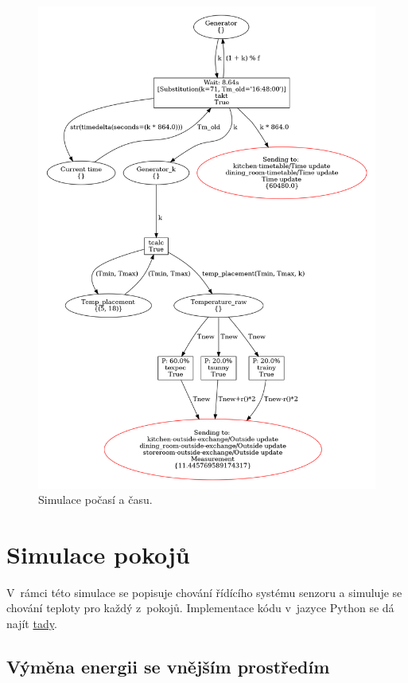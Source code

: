 \begin{figure}[htb]
 \centering
 \includegraphics[width=\textwidth]{obrazky-figures/weather-sim.png}
 \caption{Simulace počasí a času.}
 \label{weather-viz}
\end{figure}

\section{Simulace pokojů}
\label{sec:room-sim-details}

V~rámci této simulace se popisuje chování řídícího systému senzoru a simuluje se chování teploty pro každý z~pokojů. Implementace kódu v~jazyce Python se dá najít \href{https://github.com/Danil-Grigorev/rt-sim-petry-net/tree/master/sample_nets}{tady}.

\subsection{Výměna energii se vnějším prostředím}
\label{subsec:energy-exchange}

